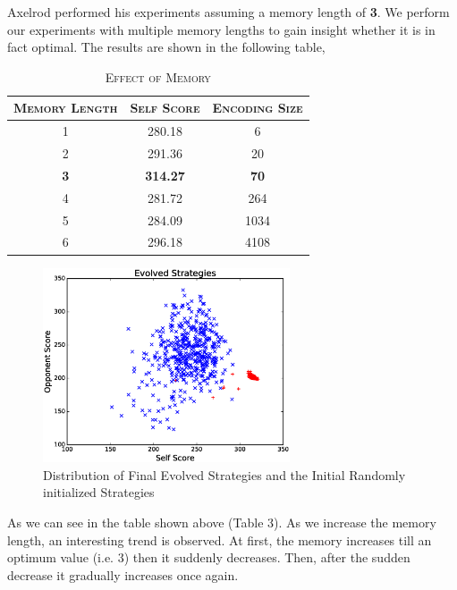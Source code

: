 \documentclass[a4paper]{article}
\begin{document}
	Axelrod performed his experiments assuming a memory length of \textbf{3}. We perform our experiments with multiple memory lengths to gain insight whether it is in fact optimal. The results are shown in the following table,
	
	\begin{table}[H]
	  \begin{center}
	    \begin{tabular}{c|c|c}
	      \toprule
	      \textsc{Memory Length} & \textsc{Self Score} & \textsc{Encoding Size}\\
	      \midrule
	      1 & 280.18 & 6\\
		  2 & 291.36 & 20\\
		  \textbf{3} & \textbf{314.27} & \textbf{70}\\
		  4 & 281.72 & 264\\
		  5 & 284.09 & 1034\\
		  6 & 296.18 & 4108\\		  
		  \bottomrule
	    \end{tabular}
	    \caption{\textsc{Effect of Memory}}
	  \end{center}
	\end{table}  

	\begin{figure}[H]
	\centering
	\includegraphics[width=0.65\textwidth]{evolvePlot.eps}
	\caption{{Distribution of Final Evolved Strategies and the Initial Randomly initialized Strategies}}
	\end{figure}

	As we can see in the table shown above (Table 3). As we increase the memory length, an interesting trend is observed. At first, the memory increases till an optimum value (i.e. 3) then it suddenly decreases. Then, after the sudden decrease it gradually increases once again.\\
	
\end{document}
